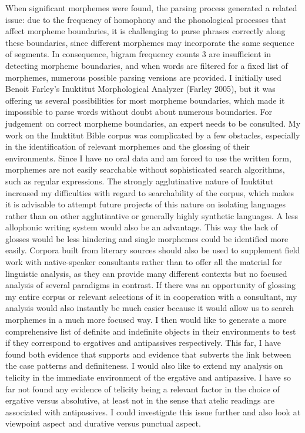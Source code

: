 \documentclass[12pt]{article}
\begin{document}
When significant morphemes were found, the parsing process generated a related issue: due to the frequency of homophony and the phonological processes that affect morpheme boundaries, it is challenging to parse phrases correctly along these boundaries, since different morphemes may incorporate the same sequence of segments. In consequence, bigram frequency counts 3 are insufficient in detecting morpheme boundaries, and when words are filtered for a fixed list of morphemes, numerous possible parsing versions are provided. I initially used Benoit Farley’s Inuktitut Morphological Analyzer (Farley 2005), but it was offering us several possibilities for most morpheme boundaries, which made it impossible to parse words without doubt about numerous boundaries. For judgement on correct morpheme boundaries, an expert needs to be consulted.
My work on the Inuktitut Bible corpus was complicated by a few obstacles, especially in the identification of relevant morphemes and the glossing of their environments. Since I have no oral data and am forced to use the written form, morphemes are not easily searchable without sophisticated search algorithms, such as regular expressions. The strongly agglutinative nature of Inuktitut increased my  difficulties with regard to searchability of the corpus, which makes it is advisable to attempt future projects of this nature on isolating languages rather than on other agglutinative or generally highly synthetic languages. A less allophonic writing system would also be an advantage. This way the lack of glosses would be less hindering and single morphemes could be identified more easily. Corpora built from literary sources should also be used to supplement field work with native-speaker consultants rather than to offer all the material for linguistic analysis, as they can provide many different contexts but no focused analysis of several paradigms in contrast.
If there was an opportunity of glossing my entire corpus or relevant selections of it in cooperation with a consultant, my analysis would also instantly be much easier because it would allow us to search morphemes in a much more focused way. I then would like to generate a more comprehensive list of definite and indefinite objects in their environments to test if they correspond to ergatives and antipassives respectively. This far, I have found both evidence that supports and evidence that subverts the link between the case patterns and definiteness.
I would also like to extend my analysis on telicity in the immediate environment of the ergative and antipassive. I have so far not found any evidence of telicity being a relevant factor in the choice of ergative versus absolutive, at least not in the sense that atelic readings are associated with antipassives. I could investigate this issue further and also look at viewpoint aspect and durative versus punctual aspect. 
\end{document}
